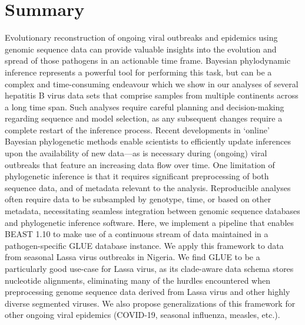 \chapter{Summary}                                 \label{ch:summary}

Evolutionary reconstruction of ongoing viral outbreaks and epidemics using genomic sequence data can provide valuable insights into the evolution and spread of those pathogens in an actionable time frame.
Bayesian phylodynamic inference represents a powerful tool for performing this task, but can be a complex and time-consuming endeavour which we show in our analyses of several hepatitis B virus data sets that comprise samples from multiple continents across a long time span.
Such analyses require careful planning and decision-making regarding sequence and model selection, as any subsequent changes require a complete restart of the inference process.
Recent developments in ‘online’ Bayesian phylogenetic methods enable scientists to efficiently update inferences upon the availability of new data—as is necessary during (ongoing) viral outbreaks that feature an increasing data flow over time.
One limitation of phylogenetic inference is that it requires significant preprocessing of both sequence data, and of metadata relevant to the analysis.
Reproducible analyses often require data to be subsampled by genotype, time, or based on other metadata, necessitating seamless integration between genomic sequence databases and phylogenetic inference software.
Here, we implement a pipeline that enables BEAST 1.10 to make use of a continuous stream of data maintained in a pathogen-specific GLUE database instance.
We apply this framework to data from seasonal Lassa virus outbreaks in Nigeria.
We find GLUE to be a particularly good use-case for Lassa virus, as its clade-aware data schema stores nucleotide alignments, eliminating many of the hurdles encountered when preprocessing genome sequence data derived from Lassa virus and other highly diverse segmented viruses.
We also propose generalizations of this framework for other ongoing viral epidemics (COVID-19, seasonal influenza, measles, etc.).


\cleardoublepage

